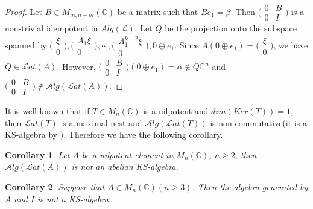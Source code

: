 \documentclass[a4paper,10pt]{amsart}
\newtheorem{corollary}{Corollary}[section]
\theoremstyle{refs}
\newcommand{\LLL}{\mathcal L} %
\newcommand{\Lat}{\mathcal Lat}
\newcommand{\Alg}{\mathcal Alg}
\newcommand{\C}{\mathbb C} %
\begin{document}
\begin{proof}
Let $B \in M_{m, n-m}(\C)$ be a matrix such that $Be_1 = \beta$. Then
$\bigl(\begin{smallmatrix}
 0 & B\\
 0 & I
\end{smallmatrix} \bigr)$ is a non-trivial idempotent in $Alg(\LLL)$.
Let $\widetilde{Q}$ be the projection onto the subspace spanned by
$\bigl(\begin{smallmatrix}
 \xi\\
 0
\end{smallmatrix} \bigr)
,
\bigl(\begin{smallmatrix}
 A_{1}\xi\\
 0
\end{smallmatrix} \bigr),\cdots,
\bigl(\begin{smallmatrix}
 A_{1}^{k-2}\xi\\
 0
\end{smallmatrix} \bigr),
0 \oplus e_1$.
Since
$A (0 \oplus e_1)= \bigl(\begin{smallmatrix}
 \xi\\
 0
\end{smallmatrix} \bigr)$,
we have $\widetilde{Q} \in \Lat(A)$. However,
$\bigl(\begin{smallmatrix}
 0 & B\\
 0 & I
\end{smallmatrix} \bigr)(0 \oplus e_1) = \alpha \notin \widetilde{Q} \C^{n}
$
and $\bigl(\begin{smallmatrix}
 0 & B\\
 0 & I
\end{smallmatrix}\bigr) \notin \Alg(\Lat(A))$.
\end{proof}

It is well-known that if $T \in M_n(\C)$ is a nilpotent and $dim(Ker(T)) = 1$,
then $\Lat(T)$ is a maximal nest and $\Alg(\Lat(T))$ is non-commutative(it is a
KS-algebra by \cite{GY1}). Therefore we have the following corollary.

\begin{corollary} \label{cor6}
Let $A$ be a nilpotent element in $M_n(\C)$, $n \geq 2$, then $\Alg(\Lat(A))$
is not an abelian KS-algebra.
\end{corollary}

\begin{corollary}\label{cor7} Suppose that $A\in M_n(\mathbb{C})(n\geq
3)$. Then the algebra generated by
$A$ and $I$ is not a KS-algebra.
\end{corollary}
\end{document}
